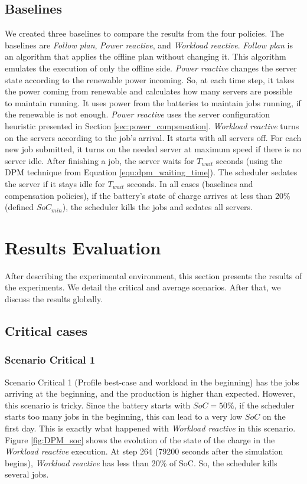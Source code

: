 \subsection{Baselines}
We created three baselines to compare the results from the four policies. The baselines are \emph{Follow plan}, \emph{Power reactive}, and \emph{Workload reactive}. \emph{Follow plan} is an algorithm that applies the offline plan without changing it. This algorithm emulates the execution of only the offline side. \emph{Power reactive} changes the server state according to the renewable power incoming. So, at each time step, it takes the power coming from renewable and calculates how many servers are possible to maintain running. It uses power from the batteries to maintain jobs running, if the renewable is not enough. \emph{Power reactive} uses the server configuration heuristic presented in Section \ref{sec:power_compensation}. \emph{Workload reactive} turns on the servers according to the job's arrival. It starts with all servers off. For each new job submitted, it turns on the needed server at maximum speed if there is no server idle. After finishing a job, the server waits for $T_{wait}$ seconds (using the DPM technique from Equation \ref{equ:dpm_waiting_time}). The scheduler sedates the server if it stays idle for $T_{wait}$ seconds. In all cases (baselines and compensation policies), if the battery's state of charge arrives at less than 20\% (defined $SoC_{min}$), the scheduler kills the jobs and sedates all servers. 

\section{Results Evaluation}

After describing the experimental environment, this section presents the results of the experiments. We detail the critical and average scenarios. After that, we discuss the results globally.

\subsection{Critical cases}

\subsubsection{Scenario Critical 1}
Scenario Critical 1 (Profile best-case and workload in the beginning) has the jobs arriving at the beginning, and the production is higher than expected. However, this scenario is tricky. Since the battery starts with $SoC = 50\%$, if the scheduler starts too many jobs in the beginning, this can lead to a very low $SoC$ on the first day. This is exactly what happened with \emph{Workload reactive} in this scenario. Figure \ref{fig:DPM_soc} shows the evolution of the state of the charge in the \emph{Workload reactive} execution. At step 264 (79200 seconds after the simulation begins), \emph{Workload reactive} has less than 20\% of SoC. So, the scheduler kills several jobs. 

